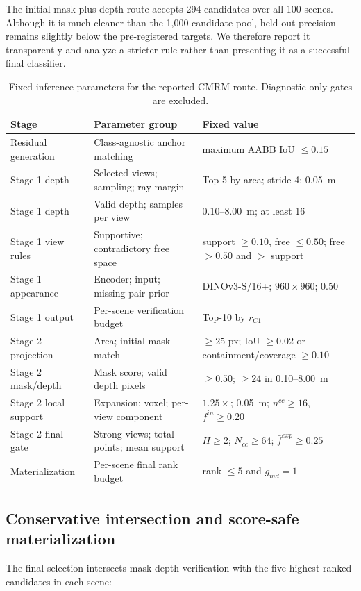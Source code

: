 \documentclass[11pt,a4paper]{article}
\begin{document}
The initial mask-plus-depth route accepts 294 candidates over all 100 scenes. Although it is much cleaner than the 1,000-candidate pool, held-out precision remains slightly below the pre-registered targets. We therefore report it transparently and analyze a stricter rule rather than presenting it as a successful final classifier.

\begin{table}[H]
\centering
\footnotesize
\caption{Fixed inference parameters for the reported CMRM route. Diagnostic-only gates are excluded.}
\label{tab:fixed_parameters}
\begin{tabularx}{\textwidth}{p{}X p{}}
\toprule
Stage & Parameter group & Fixed value \\
\midrule
Residual generation & Class-agnostic anchor matching & maximum AABB IoU $\le0.15$ \\
Stage 1 depth & Selected views; sampling; ray margin & Top-5 by area; stride 4; 0.05~m \\
Stage 1 depth & Valid depth; samples per view & 0.10--8.00~m; at least 16 \\
Stage 1 view rules & Supportive; contradictory free space & support $\ge0.10$, free $\le0.50$; free $>0.50$ and $>$ support \\
Stage 1 appearance & Encoder; input; missing-pair prior & DINOv3-S/16+; $960\times960$; 0.50 \\
Stage 1 output & Per-scene verification budget & Top-10 by $r_{C1}$ \\
Stage 2 projection & Area; initial mask match & $\ge25$ px; IoU $\ge0.02$ or containment/coverage $\ge0.10$ \\
Stage 2 mask/depth & Mask score; valid depth pixels & $\ge0.50$; $\ge24$ in 0.10--8.00~m \\
Stage 2 local support & Expansion; voxel; per-view component & $1.25\times$; 0.05~m; $n^{cc}\ge16$, $f^{in}\ge0.20$ \\
Stage 2 final gate & Strong views; total points; mean support & $H\ge2$; $N_{cc}\ge64$; $\bar f^{exp}\ge0.25$ \\
Materialization & Per-scene final rank budget & rank $\le5$ and $g_{md}=1$ \\
\bottomrule
\end{tabularx}
\end{table}

\subsection{Conservative intersection and score-safe materialization}
The final selection intersects mask-depth verification with the five highest-ranked candidates in each scene:
\end{document}
